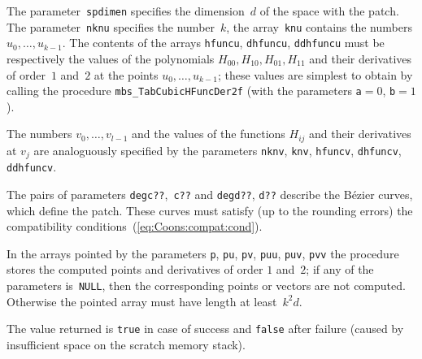 The parameter~\texttt{spdimen} specifies the dimension~$d$ of the space with
the patch. The parameter~\texttt{nknu} specifies the number~$k$, the
array~\texttt{knu} contains the numbers $u_0,\ldots,u_{k-1}$. The contents
of the arrays \texttt{hfuncu}, \texttt{dhfuncu}, \texttt{ddhfuncu} must be
respectively the values of the polynomials $H_{00},H_{10},H_{01},H_{11}$
and their derivatives of order~$1$ and~$2$ at the points
$u_0,\ldots,u_{k-1}$; these values are simplest to obtain by calling
the procedure \texttt{mbs\_TabCubicHFuncDer2f}
(with the parameters \texttt{a}${}=0$, \texttt{b}${}=1$).

The numbers $v_0,\ldots,v_{l-1}$ and the values of the functions $H_{ij}$
and their derivatives at $v_j$ are analoguously specified by the parameters
\texttt{nknv}, \texttt{knv}, \texttt{hfuncv}, \texttt{dhfuncv},
\texttt{ddhfuncv}.

The pairs of parameters \texttt{degc??},~\texttt{c??} and \texttt{degd??},
\texttt{d??} describe the B\'{e}zier curves, which define the patch.
These curves must satisfy (up to the rounding errors)
the compatibility conditions~(\ref{eq:Coons:compat:cond}).

In the arrays pointed by the parameters \texttt{p}, \texttt{pu}, \texttt{pv},
\texttt{puu}, \texttt{puv}, \texttt{pvv} the procedure stores the computed
points and derivatives of order $1$ and~$2$; if any of the parameters
is~\texttt{NULL}, then the corresponding points or vectors are not computed.
Otherwise the pointed array must have length at least~$k^2d$.

The value returned is \texttt{true} in case of success and \texttt{false}
after failure (caused by insufficient space on the scratch memory stack).


